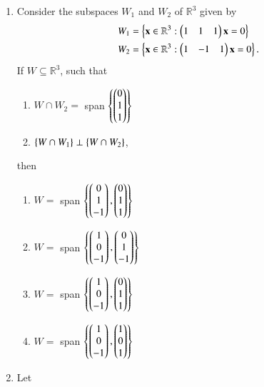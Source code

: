 \renewcommand{\theequation}{\theenumi}
\renewcommand{\thefigure}{\theenumi}
\begin{enumerate}[label=\thesection.\arabic*.,ref=\thesection.\theenumi]

\item Consider the subspaces $W_1$ and $W_2$ of $\mathbb{R}^3$ given by
\begin{align}
W_1 &= \left\{\mathbf{x} \in \mathbb{R}^3: \begin{pmatrix}1 & 1 & 1\end{pmatrix}\mathbf{x} = 0\right\}
\label{eq:solutions/2018/dec/27/eq:1}
\\
W_2 &= \left\{\mathbf{x} \in \mathbb{R}^3: \begin{pmatrix}1 & -1 & 1\end{pmatrix}\mathbf{x} = 0\right\}.
\label{eq:solutions/2018/dec/27/eq:2}
\end{align}
If $W \subseteq \mathbb{R}^3$, such that 
\begin{enumerate}
\item $W \cap W_2 =$ span $\left\{\begin{pmatrix}0\\1\\1\end{pmatrix}\right\}$
\label{eq:solutions/2018/dec/27/eq:3}
\item $\left\{W \cap W_1\right\} \perp \left\{W \cap W_2\right\}$, 
\label{eq:solutions/2018/dec/27/eq:4}
\end{enumerate}
then 
\begin{enumerate}
\item $W =$ span $\left\{\begin{pmatrix}0\\1\\-1\end{pmatrix},\begin{pmatrix}0\\1\\1\end{pmatrix}\right\}$
\item $W =$ span $\left\{\begin{pmatrix}1\\0\\-1\end{pmatrix},\begin{pmatrix}0\\1\\-1\end{pmatrix}\right\}$
\item $W =$ span $\left\{\begin{pmatrix}1\\0\\-1\end{pmatrix},\begin{pmatrix}0\\1\\1\end{pmatrix}\right\}$
\item $W =$ span $\left\{\begin{pmatrix}1\\0\\-1\end{pmatrix},\begin{pmatrix}1\\0\\1\end{pmatrix}\right\}$
\end{enumerate}
%
%
\item Let
\begin{align}

\end{align}
\end{enumerate}
